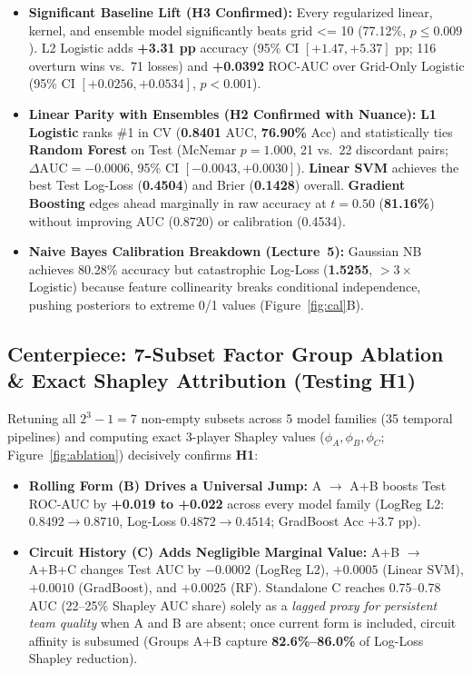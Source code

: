 \documentclass[10pt,a4paper,twocolumn]{article}
\newcommand{\code}[1]{{\fontsize{8.5pt}{10pt}\selectfont\ttfamily #1}}
\begin{document}
\begin{itemize}
  \item \textbf{Significant Baseline Lift (H3 Confirmed):} Every regularized linear, kernel, and ensemble model significantly beats \code{grid <= 10} (77.12\%, $p\le 0.009$). L2 Logistic adds \textbf{+3.31 pp} accuracy (95\% CI $[+1.47, +5.37]$ pp; 116 overturn wins vs.\ 71 losses) and \textbf{+0.0392} ROC-AUC over Grid-Only Logistic (95\% CI $[+0.0256, +0.0534]$, $p<0.001$).
  \item \textbf{Linear Parity with Ensembles (H2 Confirmed with Nuance):} \textbf{L1 Logistic} ranks \#1 in CV (\textbf{0.8401} AUC, \textbf{76.90\%} Acc) and statistically ties \textbf{Random Forest} on Test (McNemar $p=1.000$, 21 vs.\ 22 discordant pairs; $\Delta\text{AUC}=-0.0006$, 95\% CI $[-0.0043, +0.0030]$). \textbf{Linear SVM} achieves the best Test Log-Loss (\textbf{0.4504}) and Brier (\textbf{0.1428}) overall. \textbf{Gradient Boosting} edges ahead marginally in raw accuracy at $t=0.50$ (\textbf{81.16\%}) without improving AUC (0.8720) or calibration (0.4534).
  \item \textbf{Naive Bayes Calibration Breakdown (Lecture~5):} Gaussian NB achieves 80.28\% accuracy but catastrophic Log-Loss (\textbf{1.5255}, $>3\times$ Logistic) because feature collinearity breaks conditional independence, pushing posteriors to extreme 0/1 values (Figure~\ref{fig:cal}B).
\end{itemize}

\subsection{Centerpiece: 7-Subset Factor Group Ablation \& Exact Shapley Attribution (Testing H1)}
Retuning all $2^3 - 1 = 7$ non-empty subsets across 5 model families (35 temporal pipelines) and computing exact 3-player Shapley values ($\phi_A, \phi_B, \phi_C$; Figure~\ref{fig:ablation}) decisively confirms \textbf{H1}:
\begin{itemize}
  \item \textbf{Rolling Form (B) Drives a Universal Jump:} \code{A} $\rightarrow$ \code{A+B} boosts Test ROC-AUC by \textbf{+0.019 to +0.022} across every model family (LogReg L2: $0.8492 \rightarrow 0.8710$, Log-Loss $0.4872 \rightarrow 0.4514$; GradBoost Acc $+3.7$ pp).
  \item \textbf{Circuit History (C) Adds Negligible Marginal Value:} \code{A+B} $\rightarrow$ \code{A+B+C} changes Test AUC by \textbf{$-0.0002$} (LogReg L2), $+0.0005$ (Linear SVM), $+0.0010$ (GradBoost), and $+0.0025$ (RF). Standalone \code{C} reaches 0.75--0.78 AUC (22--25\% Shapley AUC share) solely as a \emph{lagged proxy for persistent team quality} when A and B are absent; once current form is included, circuit affinity is subsumed (Groups A+B capture \textbf{82.6\%--86.0\%} of Log-Loss Shapley reduction).
\end{itemize}
\end{document}
